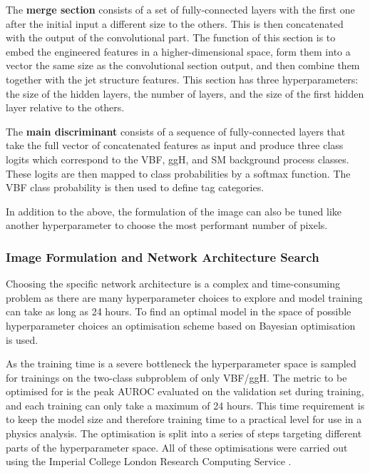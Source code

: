 The \textbf{merge section} consists of a set of fully-connected layers with the first one after the initial input a different size to the others. This is then concatenated with the output of the convolutional part.
The function of this section is to embed the engineered features in a higher-dimensional space, form them into a vector the same size as the convolutional section output, and then combine them together with the jet structure features. This section has three hyperparameters: the size of the hidden layers, the number of layers, and the size of the first hidden layer relative to the others. 


The \textbf{main discriminant} consists of a sequence of fully-connected layers that take the full vector of concatenated features as input and produce three class logits which correspond to the VBF, ggH, and SM background process classes. 
These logits are then mapped to class probabilities by a softmax function. The VBF class probability is then used to define tag categories. 

In addition to the above, the formulation of the image can also be tuned like another hyperparameter to choose the most performant number of pixels. 



\subsubsection{Image Formulation and Network Architecture Search}
Choosing the specific network architecture is a complex and time-consuming problem as there are many hyperparameter choices to explore and model training can take as long as 24 hours.
To find an optimal model in the space of possible hyperparameter choices an optimisation scheme based on Bayesian optimisation is used. 


As the training time is a severe bottleneck the hyperparameter space is sampled for trainings on the two-class subproblem of only VBF/ggH. 
The metric to be optimised for is the peak AUROC evaluated on the validation set during training, and each training can only take a maximum of 24 hours. 
This time requirement is to keep the model size and therefore training time to a practical level for use in a physics analysis.  
The optimisation is split into a series of steps targeting different parts of the hyperparameter space.
All of these optimisations were carried out using the Imperial College London Research Computing Service \cite{IC_HPC}.

